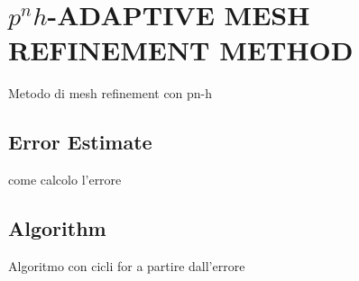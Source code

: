 \section*{$p^n h$-ADAPTIVE MESH REFINEMENT METHOD}

Metodo di mesh refinement con pn-h



\subsection*{Error Estimate}

come calcolo l'errore
\subsection*{Algorithm}

Algoritmo con cicli for a partire dall'errore